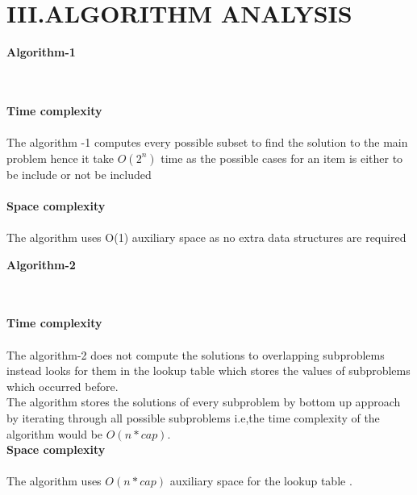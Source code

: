 \documentclass[twocolumn]{article}
\begin{document}
\section*{III.ALGORITHM ANALYSIS}
\centerline{\textbf{Algorithm-1}}\\
\\
\textbf{Time complexity}\\
\\
The algorithm -1 computes every possible subset to find the solution to the main problem hence it take $O(2^n)$ time as the possible cases for an item is either to be include or not be included \\
\\
\textbf{Space complexity}\\
\\
The algorithm uses O(1) auxiliary space as no extra data structures are required\\

\centerline{\textbf{Algorithm-2}}\\
\\

\textbf{Time complexity}\\
\\
The algorithm-2 does not compute the solutions to overlapping subproblems instead looks for them in the lookup table which stores the values of subproblems which occurred before.
\\
The algorithm stores the solutions  of every subproblem by bottom up approach by iterating through all possible subproblems i.e,the time complexity of the algorithm would be $O(n*cap)$.\\

\textbf{Space complexity}\\
\\
The algorithm uses $O(n*cap)$ auxiliary space for the lookup table .\\
\end{document}
